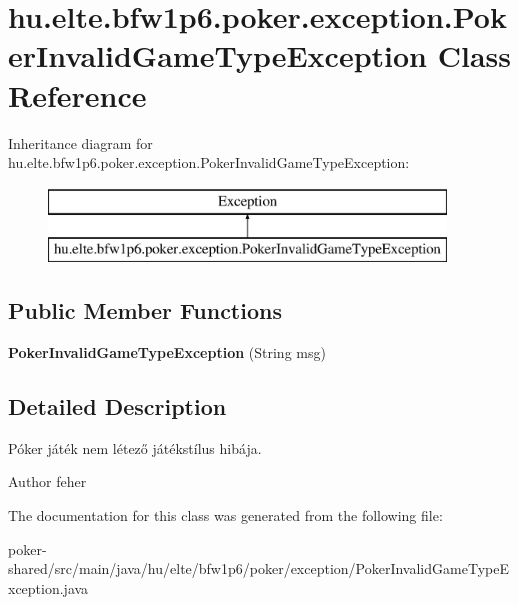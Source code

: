 \hypertarget{classhu_1_1elte_1_1bfw1p6_1_1poker_1_1exception_1_1_poker_invalid_game_type_exception}{}\section{hu.\+elte.\+bfw1p6.\+poker.\+exception.\+Poker\+Invalid\+Game\+Type\+Exception Class Reference}
\label{classhu_1_1elte_1_1bfw1p6_1_1poker_1_1exception_1_1_poker_invalid_game_type_exception}
Inheritance diagram for hu.\+elte.\+bfw1p6.\+poker.\+exception.\+Poker\+Invalid\+Game\+Type\+Exception\+:\begin{figure}[H]
\begin{center}
\leavevmode
\includegraphics[height=2.000000cm]{classhu_1_1elte_1_1bfw1p6_1_1poker_1_1exception_1_1_poker_invalid_game_type_exception}
\end{center}
\end{figure}
\subsection*{Public Member Functions}
\begin{DoxyCompactItemize}
\item 
\hypertarget{classhu_1_1elte_1_1bfw1p6_1_1poker_1_1exception_1_1_poker_invalid_game_type_exception_ad41550947fb9155852dd1e3707ae7266}{}{\bfseries Poker\+Invalid\+Game\+Type\+Exception} (String msg)\label{classhu_1_1elte_1_1bfw1p6_1_1poker_1_1exception_1_1_poker_invalid_game_type_exception_ad41550947fb9155852dd1e3707ae7266}

\end{DoxyCompactItemize}


\subsection{Detailed Description}
Póker játék nem létező játékstílus hibája. \begin{DoxyAuthor}{Author}
feher 
\end{DoxyAuthor}


The documentation for this class was generated from the following file\+:\begin{DoxyCompactItemize}
\item 
poker-\/shared/src/main/java/hu/elte/bfw1p6/poker/exception/Poker\+Invalid\+Game\+Type\+Exception.\+java\end{DoxyCompactItemize}
